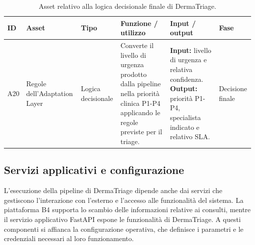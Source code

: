 \begin{table}[H]
    \centering
    \small
    \setlength{\tabcolsep}{4pt}
    \renewcommand{\arraystretch}{1.08}

    \begin{tabularx}{\textwidth}{
        >{\raggedright\arraybackslash}p{0.6cm}
        >{\raggedright\arraybackslash}p{2.5cm}
        >{\raggedright\arraybackslash}p{1.6cm}
        X
        X
        >{\raggedright\arraybackslash}p{1.8cm}
    }
        \toprule

        \textbf{ID} &
        \textbf{Asset} &
        \textbf{Tipo} &
        \textbf{Funzione / utilizzo} &
        \textbf{Input / output} &
        \textbf{Fase} \\

        \midrule

        A20 &
        Regole dell'Adaptation Layer &
        Logica decisionale &
        Converte il livello di urgenza prodotto dalla pipeline nella
        priorità clinica P1-P4 applicando le regole previste per il
        triage. &
        \textbf{Input:} livello di urgenza e relativa confidenza.
        \textbf{Output:} priorità P1-P4, specialista indicato e
        relativo SLA. &
        Decisione finale \\

        \bottomrule
    \end{tabularx}

    \caption{Asset relativo alla logica decisionale finale di DermaTriage.}
    \label{tab:asset-logica-decisionale}
\end{table}

\subsection{Servizi applicativi e configurazione}
L'esecuzione della pipeline di DermaTriage dipende anche dai servizi che gestiscono l'interazione con l'esterno e l'accesso alle funzionalità del sistema. La piattaforma B4 supporta lo scambio delle informazioni relative
ai consulti, mentre il servizio applicativo FastAPI espone le funzionalità di DermaTriage. A questi componenti si  affianca la configurazione operativa, che definisce i parametri e le credenziali necessari al loro funzionamento.

